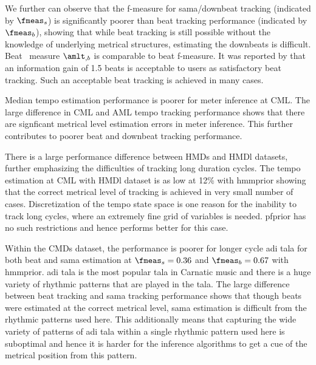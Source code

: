 We further can observe that the f-measure for \gls{sama}/downbeat tracking (indicated by $\fmeas_s$) is significantly poorer than beat tracking performance (indicated by $\fmeas_b$), showing that while beat tracking is still possible without the knowledge of underlying metrical structures, estimating the downbeats is difficult. Beat \amlt\ measure $\amlt_{,b}$ is comparable to beat f-measure. It was reported by  that an information gain of 1.5 beats is acceptable to users as satisfactory beat tracking. Such an acceptable beat tracking is achieved in many cases. 

Median tempo estimation performance is poorer for meter inference at \gls{CML}. The large difference in \gls{CML} and \gls{AML} tempo tracking performance shows that there are signficant metrical level estimation errors in meter inference. This further contributes to poorer beat and downbeat tracking performance. 

There is a large performance difference between \acrshort{HMDs} and \acrshort{HMDl} datasets, further emphasizing the difficulties of tracking long duration cycles. The tempo estimation at \gls{CML} with \acrshort{HMDl} dataset is as low at 12\% with \acrshort{hmmprior} showing that the correct metrical level of tracking is achieved in very small number of cases. Discretization of the tempo state space is one reason for the inability to track long cycles, where an extremely fine grid of variables is needed. \acrshort{pfprior} has no such restrictions and hence performs better for this case. 

Within the \acrshort{CMDs} dataset, the performance is poorer for longer cycle \gls{adi} \gls{tala} for both beat and \gls{sama} estimation at $\fmeas_s = 0.36$ and $\fmeas_b = 0.67$ with \acrshort{hmmprior}. \Gls{adi} \gls{tala} is the most popular \gls{tala} in Carnatic music and there is a huge variety of rhythmic patterns that are played in the \gls{tala}. The large difference between beat tracking and \gls{sama} tracking performance shows that though beats were estimated at the correct metrical level, \gls{sama} estimation is difficult from the rhythmic patterns used here. This additionally means that capturing the wide variety of patterns of \gls{adi} \gls{tala} within a single rhythmic pattern used here is suboptimal and hence it is harder for the inference algorithms to get a cue of the metrical position from this pattern. 

